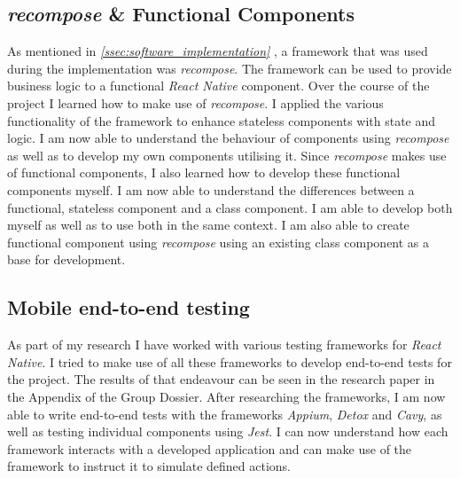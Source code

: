 \subsection{\textit{recompose} \& Functional Components}
\label{ssec:recompose}

As mentioned in \textit{\ref{ssec:software_implementation} }, a framework that was used during the implementation was \textit{recompose}. The framework can be used to provide business logic to a functional \textit{React Native} component.
\newline
Over the course of the project I learned how to make use of \textit{recompose}. I applied the various functionality of the framework to enhance stateless components with state and logic. I am now able to understand the behaviour of components using \textit{recompose} as well as to develop my own components utilising it.
\newline
Since \textit{recompose} makes use of functional components, I also learned how to develop these functional components myself. I am now able to understand the differences between a functional, stateless component and a class component. I am able to develop both myself as well as to use both in the same context. I am also able to create functional component using \textit{recompose} using an existing class component as a base for development.

\subsection{Mobile end-to-end testing}
\label{ssec:mobile_e2e_testing}

As part of my research I have worked with various testing frameworks for \textit{React Native}. I tried to make use of all these frameworks to develop end-to-end tests for the project. The results of that endeavour can be seen in the research paper in the Appendix of the Group Dossier.
\newline
After researching the frameworks, I am now able to write end-to-end tests with the frameworks \textit{Appium}, \textit{Detox} and \textit{Cavy}, as well as testing individual components using \textit{Jest}. I can now understand how each framework interacts with a developed application and can make use of the framework to instruct it to simulate defined actions.